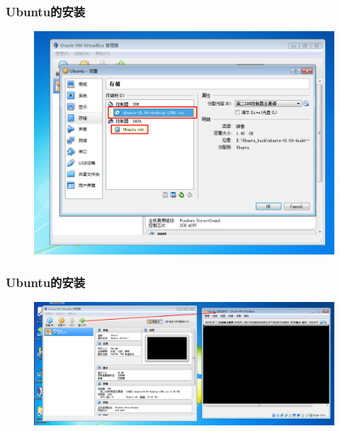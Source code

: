 \frame
{
	\frametitle{\textrm{Ubuntu}的安装}
\begin{figure}[h!]
\centering
\vspace{-5.5pt}
\includegraphics[height=0.62\textwidth]{Figures/Virtualbox-ubuntu-install-1.png}
\caption{\textrm{\fontsize{6.2pt}{5.2pt}\selectfont{The install step-2 of Ubuntu in Virtualbox.}}}
\label{Virtualbox-ubuntu-install-1}
\end{figure}
}

\frame
{
	\frametitle{\textrm{Ubuntu}的安装}
\begin{figure}[h!]
\centering
\vspace{17.5pt}
\includegraphics[height=0.41\textwidth]{Figures/Virtualbox-ubuntu-install-2.png}
\caption{\textrm{\fontsize{6.2pt}{5.2pt}\selectfont{The install step-3 of Ubuntu in Virtualbox.}}}
\label{Virtualbox-ubuntu-install-2}
\end{figure}
}

